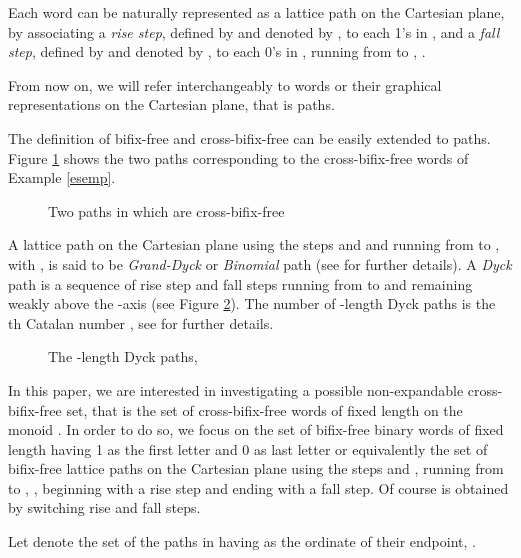 \documentclass[a4paper,11pt]{article}
\begin{document}
Each word  can be naturally represented as a
lattice path on the Cartesian plane, by associating a \emph{rise
step}, defined by  and denoted by , to each 1's in
, and a \emph{fall step}, defined by  and denoted
by , to each 0's in , running from 
to , .

From now on, we will refer interchangeably to words or their
graphical representations on the Cartesian plane, that is paths.

The definition of bifix-free and cross-bifix-free can be easily
extended to paths. Figure \ref{exmpcrossbf} shows the two paths
corresponding to the cross-bifix-free words of Example
\ref{esemp}.

\begin{figure}[!htb]
\begin{center}
 \caption{\small{Two
paths in  which are cross-bifix-free}
\label{exmpcrossbf}}\vspace{-15pt}
\end{center}
\end{figure}

A lattice path on the Cartesian plane using the steps  and
 and running from  to , with , is
said to be \emph{Grand-Dyck} or \emph{Binomial} path (see \cite{5}
for further details). A \emph{Dyck} path is a sequence of rise
step and fall steps running from  to  and remaining
weakly above the -axis (see Figure \ref{dick}). The number of
-length Dyck paths is the th Catalan number , see \cite{13} for further details.

\begin{figure}[!htb]
\begin{center}
 \caption{\small{The
-length Dyck paths, }
\label{dick}}\vspace{-15pt}
\end{center}
\end{figure}

In this paper, we are interested in investigating a possible
non-expandable cross-bifix-free set, that is the set 
of cross-bifix-free words of fixed length  on the monoid
. In order to do so, we focus on the set
 of bifix-free binary words of fixed length 
having 1 as the first letter and 0 as last letter or equivalently
the set of bifix-free lattice paths on the Cartesian plane using
the steps  and , running from  to ,
, beginning with a rise step and ending with a fall step.
Of course  is
obtained by switching rise and fall steps.

Let  denote the set of the paths in
 having  as the ordinate of their endpoint, .
\end{document}
